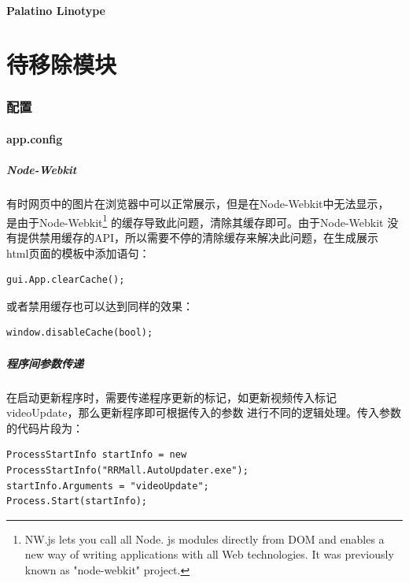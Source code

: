 \documentclass{book}
\begin{document}
\subsection{Palatino Linotype}



\part{待移除模块}
	
\clearpage
\mbox{}         
\clearpage

\section{配置}

\subsection{app.config}

\subsubsection{Node-Webkit}

有时网页中的图片在浏览器中可以正常展示，但是在Node-Webkit中无法显示，
是由于Node-Webkit\footnote{NW.js lets you call all Node.
js modules directly from DOM and enables a new way of 
writing applications with all Web technologies. 
It was previously known as "node-webkit" project.}
的缓存导致此问题，清除其缓存即可。由于Node-Webkit
没有提供禁用缓存的API，所以需要不停的清除缓存来解决此问题，在生成展示
html页面的模板中添加语句：

\begin{lstlisting}
gui.App.clearCache();
\end{lstlisting}
或者禁用缓存也可以达到同样的效果：
\begin{lstlisting}
window.disableCache(bool);
\end{lstlisting}

\subsubsection{程序间参数传递}

在启动更新程序时，需要传递程序更新的标记，如更新视频传入标记videoUpdate，那么更新程序即可根据传入的参数
进行不同的逻辑处理。传入参数的代码片段为：
\begin{lstlisting}
ProcessStartInfo startInfo = new ProcessStartInfo("RRMall.AutoUpdater.exe");
startInfo.Arguments = "videoUpdate";
Process.Start(startInfo);
\end{lstlisting}
\end{document}
